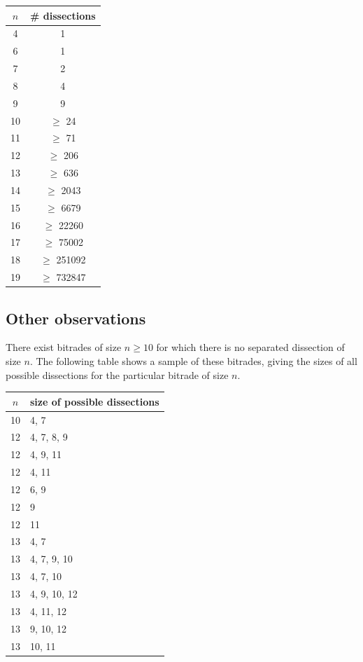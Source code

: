 \documentclass[12pt,amstags,fleqn]{article}
\theoremstyle{plain}
\theoremstyle{definition}
\theoremstyle{definition}
\begin{document}
\begin{center}
\begin{tabular}{|c|c|}
\hline $n$ & \# dissections \\
\hline
\hline 4 & 1 \\
\hline 6 & 1 \\
\hline 7 & 2 \\
\hline 8 & 4 \\
\hline 9 & 9 \\
\hline 10 & $\geqslant$ 24 \\
\hline 11 & $\geqslant$ 71 \\
\hline 12 & $\geqslant$ 206 \\
\hline 13 & $\geqslant$ 636 \\
\hline 14 & $\geqslant$ 2043 \\
\hline 15 & $\geqslant$ 6679 \\
\hline 16 & $\geqslant$ 22260 \\
\hline 17 & $\geqslant$ 75002 \\
\hline 18 & $\geqslant$ 251092 \\
\hline 19 & $\geqslant$ 732847 \\
\hline
\end{tabular}
\end{center}

\subsection{Other observations}

There exist bitrades of size $n \geq 10$ for which there is no
separated dissection of size $n$. The following table shows a sample
of these bitrades, giving the sizes of all possible dissections for
the particular bitrade of size $n$.

\begin{center}
\begin{tabular}{|c|l|}
\hline
$n$ & size of possible dissections \\
\hline
\hline 10 & 4, 7  \\
\hline 12 & 4, 7, 8, 9  \\
\hline 12 & 4, 9, 11  \\
\hline 12 & 4, 11  \\
\hline 12 & 6, 9  \\
\hline 12 & 9  \\
\hline 12 & 11  \\
\hline 13 & 4, 7  \\
\hline 13 & 4, 7, 9, 10  \\
\hline 13 & 4, 7, 10  \\
\hline 13 & 4, 9, 10, 12  \\
\hline 13 & 4, 11, 12  \\
\hline 13 & 9, 10, 12  \\
\hline 13 & 10, 11  \\
\hline
\end{tabular}
\end{center}
\end{document}
